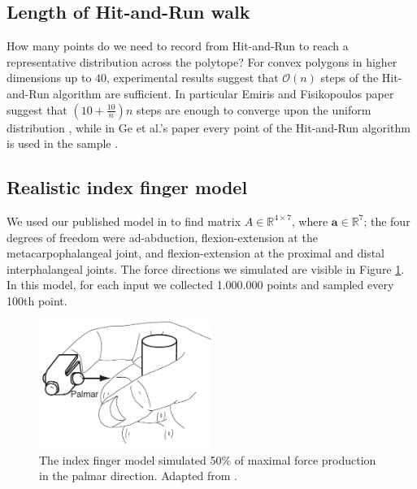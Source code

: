 


\subsection{Length of Hit-and-Run walk}
\label{sec_lengthrun}
How many points do we need to record from Hit-and-Run to reach a representative distribution across the polytope? For convex polygons in higher dimensions up to $40$, experimental results suggest that $\mathcal{O}(n)$ steps of the Hit-and-Run algorithm are sufficient.
In particular Emiris and Fisikopoulos paper suggest that $(10 + \frac{10}{n})n$ steps are enough to converge upon the uniform distribution \cite{emiris2013efficient}, while in Ge et al.'s paper every point of the Hit-and-Run algorithm is used in the sample \cite{Ge}. 


\subsection{Realistic index finger model}
\label{ss:finger}
We used our published model in \cite{Valero-Cuevas1998Large} to find matrix $A \in \mathbb{R}^{4 \times 7}$, where $\textbf{a} \in \mathbb{R}^7$; the four degrees of freedom were ad-abduction, flexion-extension at the metacarpophalangeal joint, and flexion-extension at the proximal and distal interphalangeal joints.
The force directions we simulated are visible in Figure \ref{fig:finger}. In this model, for each input we collected 1.000.000 points and sampled every 100th point.

\begin{figure}[htbp]
  \centering
  \includegraphics[width=0.5\textwidth]{sections/figs/finger.pdf}
  \caption{The index finger model simulated 50\% of maximal force production in the palmar direction. Adapted from \cite{Valero-Cuevas1998Large}.}
  \label{fig:finger}
\end{figure}



